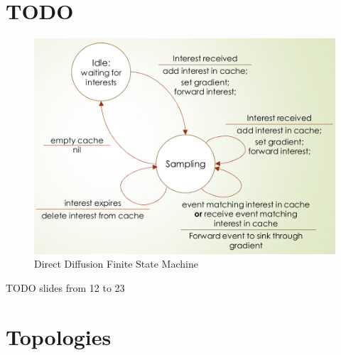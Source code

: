 \section{TODO}
\begin{figure}[htbp]
   \centering
   \includegraphics{images/ddiff_FSM.png}
   \caption{Direct Diffusion Finite State Machine}
   \label{fig:ddiff_FSM}
\end{figure}
TODO slides from 12 to 23

\newpage


\section{Topologies}

